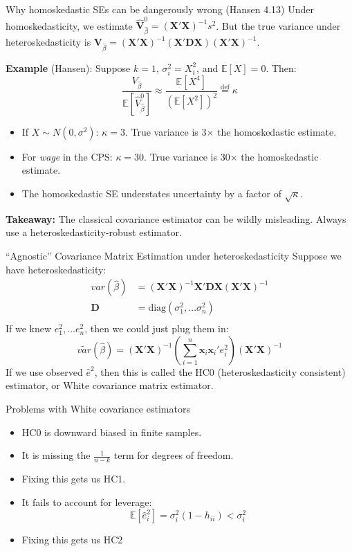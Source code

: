 \documentclass[aspectratio=169, handout, t]{beamer}
\numberwithin{equation}{section}
\begin{document}
\begin{frame}{Why homoskedastic SEs can be dangerously wrong (Hansen 4.13)}
Under homoskedasticity, we estimate $\hat{\bm{V}}^0_{\hat{\beta}}=(\bm{X'X})^{-1}s^2$.
But the \alert{true} variance under heteroskedasticity is
$\bm{V}_{\hat{\beta}}=(\bm{X'X})^{-1}(\bm{X'DX})(\bm{X'X})^{-1}$.\pause

\medskip
\textbf{Example} (Hansen): Suppose $k=1$, $\sigma_i^2=X_i^2$, and $\mathbb{E}[X]=0$. Then:
$$\frac{V_{\hat{\beta}}}{\mathbb{E}\left[\hat{V}^0_{\hat{\beta}}\right]}\approx \frac{\mathbb{E}[X^4]}{(\mathbb{E}[X^2])^2}\stackrel{\text{def}}{=}\kappa$$\pause
\begin{itemize}
\item If $X\sim N(0,\sigma^2)$: $\kappa=3$. True variance is \alert{3$\times$} the homoskedastic estimate.
\item For \emph{wage} in the CPS: $\kappa=30$. True variance is \alert{30$\times$} the homoskedastic estimate.
\item The homoskedastic SE understates uncertainty by a factor of $\sqrt{\kappa}$.
\end{itemize}\pause
\smallskip
\textbf{Takeaway:} The classical covariance estimator can be wildly misleading.  Always use a heteroskedasticity-robust estimator.
\end{frame}

\begin{frame}{``Agnostic'' Covariance Matrix Estimation under heteroskedasticity}
Suppose we have heteroskedasticity:
\begin{align*}
var(\hat{\beta})&=(\bm{X'X})^{-1}\bm{X'}\bm{D}\bm{X}(\bm{X'X})^{-1}\\
\bm{D}&=\text{diag}(\sigma_1^2,\ldots \sigma_n^2)\\
\end{align*}\pause
If we knew $e_1^2,\ldots e_n^2$, then we could just plug them in:
$$\tilde{var}(\hat{\beta})=(\bm{X'X})^{-1}(\sum_{i=1}^n \bm{x}_i\bm{x}_i'e_i^2)(\bm{X'X})^{-1}$$
If we use observed $\hat{e}^2$, then this is called the HC0 (heteroskedasticity consistent) estimator, or White covariance matrix estimator.  
\end{frame}

\begin{frame}{Problems with White covariance estimators}
\begin{itemize}
\item HC0 is downward biased in finite samples.
\item It is missing the $\frac{1}{n-k}$ term for degrees of freedom. 
\item[$\rightarrow$] Fixing this gets us HC1.
\item It fails to account for leverage:
$$\mathbb{E}[\hat{e}_i^2]=\sigma^2_i(1-h_{ii})<\sigma^2_i$$
\item[$\rightarrow$] Fixing this gets us HC2
\end{itemize}
\end{frame}
\end{document}
